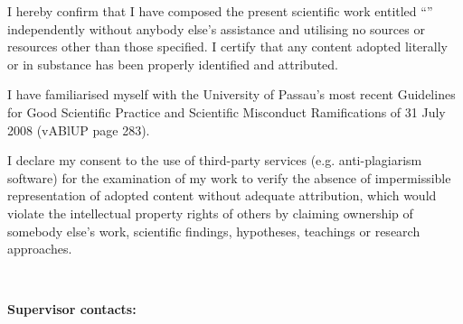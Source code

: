 I hereby confirm that I have composed the present scientific work entitled “\worktitle” independently without anybody else’s assistance and utilising no sources or resources other than those specified. I certify that any content adopted literally or in substance has been properly identified and attributed.

I have familiarised myself with the University of Passau’s most recent Guidelines for Good Scientific Practice and Scientific Misconduct Ramifications of 31 July 2008 (vABlUP page 283).

I declare my consent to the use of third-party services (e.g. anti-plagiarism software) for the examination of my work to verify the absence of impermissible representation of adopted content without adequate attribution, which would violate the intellectual property rights of others by claiming ownership of somebody else’s work, scientific findings, hypotheses, teachings or research approaches.

\cleardoublepage
~
\vfill


\textbf{Supervisor contacts:} \smallskip \\ %
\contactprofone\\
\contactproftwo\\

\cleardoublepage
